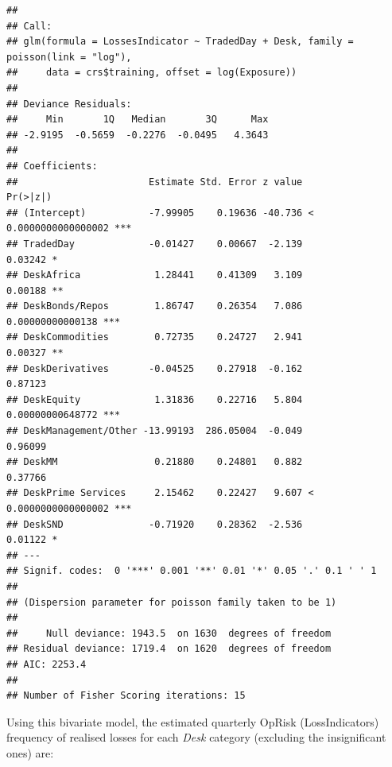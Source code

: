 \documentclass[]{article}
\begin{document}
\singlespacing

\begin{verbatim}
## 
## Call:
## glm(formula = LossesIndicator ~ TradedDay + Desk, family = poisson(link = "log"), 
##     data = crs$training, offset = log(Exposure))
## 
## Deviance Residuals: 
##     Min       1Q   Median       3Q      Max  
## -2.9195  -0.5659  -0.2276  -0.0495   4.3643  
## 
## Coefficients:
##                       Estimate Std. Error z value             Pr(>|z|)    
## (Intercept)           -7.99905    0.19636 -40.736 < 0.0000000000000002 ***
## TradedDay             -0.01427    0.00667  -2.139              0.03242 *  
## DeskAfrica             1.28441    0.41309   3.109              0.00188 ** 
## DeskBonds/Repos        1.86747    0.26354   7.086     0.00000000000138 ***
## DeskCommodities        0.72735    0.24727   2.941              0.00327 ** 
## DeskDerivatives       -0.04525    0.27918  -0.162              0.87123    
## DeskEquity             1.31836    0.22716   5.804     0.00000000648772 ***
## DeskManagement/Other -13.99193  286.05004  -0.049              0.96099    
## DeskMM                 0.21880    0.24801   0.882              0.37766    
## DeskPrime Services     2.15462    0.22427   9.607 < 0.0000000000000002 ***
## DeskSND               -0.71920    0.28362  -2.536              0.01122 *  
## ---
## Signif. codes:  0 '***' 0.001 '**' 0.01 '*' 0.05 '.' 0.1 ' ' 1
## 
## (Dispersion parameter for poisson family taken to be 1)
## 
##     Null deviance: 1943.5  on 1630  degrees of freedom
## Residual deviance: 1719.4  on 1620  degrees of freedom
## AIC: 2253.4
## 
## Number of Fisher Scoring iterations: 15
\end{verbatim}

\doublespacing

Using this bivariate model, the estimated quarterly OpRisk
(LossIndicators) frequency of realised losses for each \emph{Desk}
category (excluding the insignificant ones) are:
\end{document}
